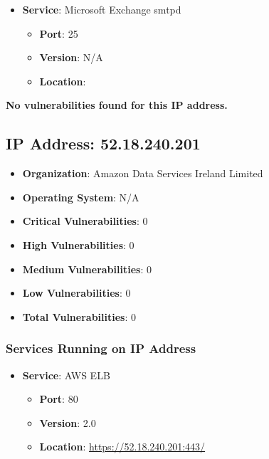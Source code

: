 \documentclass{article}
\begin{document}
\begin{itemize}
    
        \item \textbf{Service}: Microsoft Exchange smtpd
        \begin{itemize}
            \item \textbf{Port}: 25
            \item \textbf{Version}:  N/A 
            \item \textbf{Location}: \href{  }{  }
        \end{itemize}
    
\end{itemize}


\textbf{No vulnerabilities found for this IP address.}




\clearpage



\subsection*{IP Address: 52.18.240.201}

\begin{itemize}
    \item \textbf{Organization}: Amazon Data Services Ireland Limited
    \item \textbf{Operating System}:  N/A 
    \item \textbf{Critical Vulnerabilities}: 0
    \item \textbf{High Vulnerabilities}: 0
    \item \textbf{Medium Vulnerabilities}: 0
    \item \textbf{Low Vulnerabilities}: 0
    \item \textbf{Total Vulnerabilities}: 0
\end{itemize}

\subsubsection*{Services Running on IP Address}

\begin{itemize}
    
        \item \textbf{Service}: AWS ELB
        \begin{itemize}
            \item \textbf{Port}: 80
            \item \textbf{Version}:  2.0 
            \item \textbf{Location}: \href{ https://52.18.240.201:443/ }{ https://52.18.240.201:443/ }
        \end{itemize}
    
\end{itemize}
\end{document}
